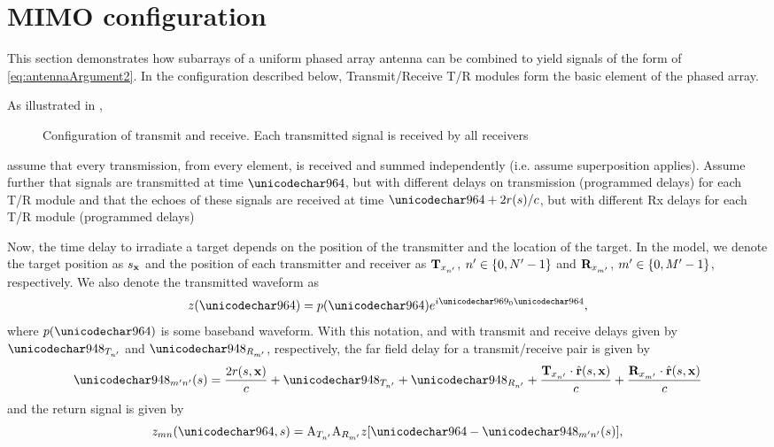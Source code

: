 \section{MIMO configuration}
\label{an:mimo}
This section demonstrates how subarrays of a uniform phased array antenna can be combined to yield signals of the form of \eqref{eq:antennaArgument2}. In the configuration described below, Transmit/Receive T/R modules form the basic element of the phased array. 
\par
As illustrated in , 
\begin{figure}[ht!]
    \resizebox{\textwidth}{!}{}
	\caption{Configuration of transmit and receive. Each transmitted signal is received by all receivers}
	\label{fg:mimo}
\end{figure}
assume that every transmission, from every element, is received and summed independently (i.e. assume superposition applies). Assume further that signals are transmitted at time $\fasttime$, but with different delays on transmission (programmed delays) for each T/R module
and that the echoes of these signals are received at time $\fasttime + 2\targetrange(\parm)/c$, but with different Rx delays for each T/R module (programmed delays)
\par
Now, the time delay to irradiate a target depends on the position of the transmitter and the location of the target. In the model, we denote the target position as $s_{\mathbf{x}}$ and the position of each transmitter and receiver as $\mathbf{T}_{x_{n'}}$, $n'\in\{0, N'-1\}$ and $\mathbf{R}_{x_{m'}}$, $m'\in\{0, M'-1\}$, respectively. We also denote the transmitted waveform as 
\begin{equation}
 \pulse(\fasttime)=\envelope(\fasttime)\eex{\im\omega_0\fasttime},
\end{equation}
where $\envelope(\fasttime)$ is some baseband waveform. With this notation, and with transmit and receive delays given by $\txDelay{\txn}$ and $\rxDelay{\txm}$, respectively, the far field delay for a transmit/receive pair is given by
\begin{equation}  \mnDelay(\parm) = \frac{2\amplitude\range(\parm, \targetnoparm)}{c} + \txDelay{\txn} + \rxDelay{\txn} 
+ \frac{\anTx{\txn}\cdot\uRangeVectorParm}{c} + \frac{\anRx{\txm}\cdot\uRangeVectorParm}{c}
\end{equation}
and the return signal is given by 
\begin{equation}
\pulse_{mn}(\fasttime, \parm) = \txAmp{\txn}\rxAmp{\txm}\pulse[\fasttime - \mnDelay(\parm)],
\end{equation}
